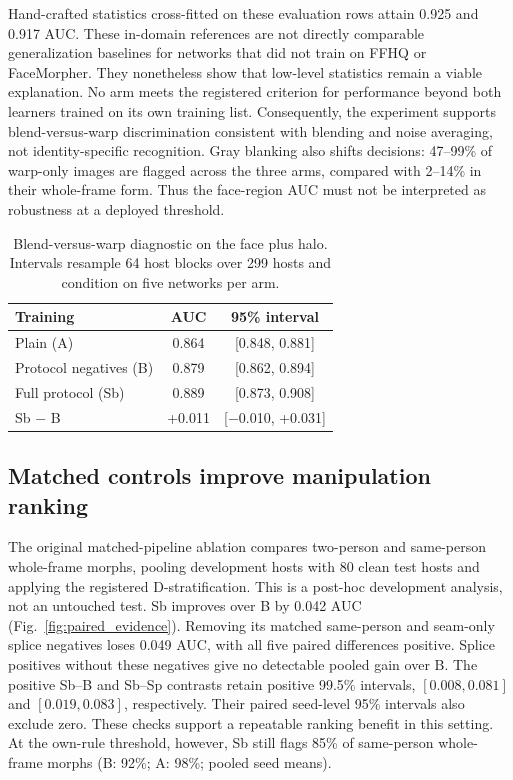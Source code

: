 Hand-crafted statistics cross-fitted on these evaluation rows attain 0.925 and 0.917 AUC. These in-domain references are not directly comparable generalization baselines for networks that did not train on FFHQ or FaceMorpher. They nonetheless show that low-level statistics remain a viable explanation. No arm meets the registered criterion for performance beyond both learners trained on its own training list. Consequently, the experiment supports blend-versus-warp discrimination consistent with blending and noise averaging, not identity-specific recognition. Gray blanking also shifts decisions: 47--99\% of warp-only images are flagged across the three arms, compared with 2--14\% in their whole-frame form. Thus the face-region AUC must not be interpreted as robustness at a deployed threshold.

\begin{table}[t]
\centering\small
\caption{Blend-versus-warp diagnostic on the face plus halo. Intervals resample 64 host blocks over 299 hosts and condition on five networks per arm.}
\label{tab:blend_controls}
\begin{tabular}{lcc}
\toprule
Training & AUC & 95\% interval \\
\midrule
Plain (A) & 0.864 & [0.848, 0.881] \\
Protocol negatives (B) & 0.879 & [0.862, 0.894] \\
Full protocol (Sb) & 0.889 & [0.873, 0.908] \\
\midrule
Sb $-$ B & +0.011 & [$-$0.010, +0.031] \\
\bottomrule
\end{tabular}
\end{table}

\subsection{Matched controls improve manipulation ranking}
\label{sec:training_results}
The original matched-pipeline ablation compares two-person and same-person whole-frame morphs, pooling development hosts with 80 clean test hosts and applying the registered D-stratification. This is a post-hoc development analysis, not an untouched test. Sb improves over B by 0.042 AUC (Fig.~\ref{fig:paired_evidence}). Removing its matched same-person and seam-only splice negatives loses 0.049 AUC, with all five paired differences positive. Splice positives without these negatives give no detectable pooled gain over B. The positive Sb--B and Sb--Sp contrasts retain positive 99.5\% intervals, $[0.008,0.081]$ and $[0.019,0.083]$, respectively. Their paired seed-level 95\% intervals also exclude zero. These checks support a repeatable ranking benefit in this setting. At the own-rule threshold, however, Sb still flags 85\% of same-person whole-frame morphs (B: 92\%; A: 98\%; pooled seed means).

